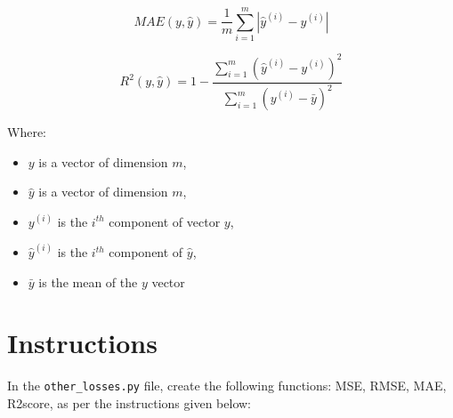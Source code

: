 \documentclass{42-en}
\begin{document}
$$
MAE(y, \hat{y}) = \frac{1}{m}\sum_{i=1}^{m}|{\hat{y}^{(i)} - y^{(i)}}|
$$

$$
R^2(y, \hat{y}) = 1 - \frac{\sum_{i=1}^{m}(\hat{y}^{(i)} - y^{(i)})^2}{\sum_{i=1}^{m}({y}^{(i)} - \bar{y})^2}
$$

Where:
\begin{itemize}
  \item $y$ is a vector of dimension $m$,
  \item $\hat{y}$ is a vector of dimension $m$,
  \item $y^{(i)}$ is the $i^{th}$ component of vector $y$,
  \item $\hat{y}^{(i)}$ is the $i^{th}$ component of $\hat{y}$,
  \item $\bar{y}$ is the mean of the $y$ vector
\end{itemize}

\newpage

\section*{Instructions}
In the \texttt{other\_losses.py} file, create the following functions: MSE, RMSE, MAE, R2score, as per the instructions given below:
\end{document}
